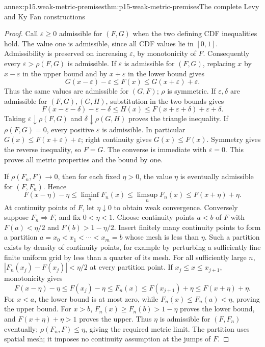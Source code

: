 \begin{annexitem}{annex:p15.weak-metric-premises}{thm:p15-weak-metric-premises}{The complete Levy and Ky Fan constructions}
\begin{proof}
Call \(\varepsilon\geq0\) admissible for \((F,G)\) when the
two defining CDF inequalities hold. The value one is
admissible, since all CDF values lie in \([0,1]\).
Admissibility is preserved on increasing \(\varepsilon\),
by monotonicity of \(F\). Consequently every
\(\varepsilon>\rho(F,G)\) is admissible.
If \(\varepsilon\) is admissible for \((F,G)\), replacing
\(x\) by \(x-\varepsilon\) in the upper bound and by
\(x+\varepsilon\) in the lower bound gives
\[
 G(x-\varepsilon)-\varepsilon\leq F(x)
                      \leq G(x+\varepsilon)+\varepsilon.
\]
Thus the same values are admissible for \((G,F)\);
\(\rho\) is symmetric.
If \(\varepsilon,\delta\) are admissible for \((F,G),(G,H)\),
substitution in the two bounds gives
\[
 F(x-\varepsilon-\delta)-\varepsilon-\delta
 \leq H(x)\leq
 F(x+\varepsilon+\delta)+\varepsilon+\delta.
\]
Taking \(\varepsilon\downarrow\rho(F,G)\) and
\(\delta\downarrow\rho(G,H)\) proves the triangle inequality.
If \(\rho(F,G)=0\), every positive \(\varepsilon\) is
admissible. In particular \(G(x)\leq F(x+\varepsilon)+\varepsilon\);
right continuity gives \(G(x)\leq F(x)\).
Symmetry gives the reverse inequality, so \(F=G\).
The converse is immediate with \(\varepsilon=0\).
This proves all metric properties and the bound by one.

If \(\rho(F_n,F)\to0\), then for each fixed \(\eta>0\),
the value \(\eta\) is eventually admissible for \((F,F_n)\).
Hence
\[
 F(x-\eta)-\eta\leq\liminf_nF_n(x)
       \leq\limsup_nF_n(x)\leq F(x+\eta)+\eta.
\]
At continuity points of \(F\), let \(\eta\downarrow0\)
to obtain weak convergence.
Conversely suppose \(F_n\Rightarrow F\), and fix \(0<\eta<1\).
Choose continuity points \(a<b\) of \(F\) with
\(F(a)<\eta/2\) and \(F(b)>1-\eta/2\).
Insert finitely many continuity points to form a partition
\(a=x_0<x_1<\cdots<x_m=b\) whose mesh is less than \(\eta\).
Such a partition exists by density of continuity points,
for example by perturbing a sufficiently fine finite uniform
grid by less than a quarter of its mesh.
For all sufficiently large \(n\),
\(|F_n(x_j)-F(x_j)|<\eta/2\) at every partition point.
If \(x_j\leq x\leq x_{j+1}\), monotonicity gives
\[
 F(x-\eta)-\eta
 \leq F(x_j)-\eta
 \leq F_n(x)
 \leq F(x_{j+1})+\eta
 \leq F(x+\eta)+\eta.
\]
For \(x<a\), the lower bound is at most zero, while
\(F_n(x)\leq F_n(a)<\eta\), proving the upper bound.
For \(x>b\), \(F_n(x)\geq F_n(b)>1-\eta\) proves the
lower bound, and \(F(x+\eta)+\eta>1\) proves the upper.
Thus \(\eta\) is admissible for \((F,F_n)\) eventually;
\(\rho(F_n,F)\leq\eta\), giving the required metric limit.
The partition uses spatial mesh; it imposes no continuity
assumption at the jumps of \(F\).


\end{proof}
\end{annexitem}
